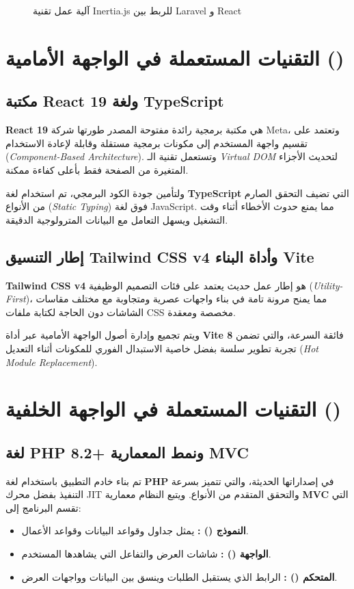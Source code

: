 \documentclass{bts-report-ar}
\begin{document}
\begin{figure}[H]
  \centering
  \begin{LTR}
  
  \end{LTR}
  \caption{آلية عمل تقنية Inertia.js للربط بين Laravel و React}
  \label{fig:inertia-bridge}
\end{figure}

\section{التقنيات المستعملة في الواجهة الأمامية ()}
\subsection{مكتبة React 19 ولغة TypeScript}
\textbf{React 19} هي مكتبة برمجية رائدة مفتوحة المصدر طورتها شركة Meta، وتعتمد على تقسيم واجهة المستخدم إلى مكونات برمجية مستقلة وقابلة لإعادة الاستخدام (\textit{Component-Based Architecture}). وتستعمل تقنية الـ \textit{Virtual DOM} لتحديث الأجزاء المتغيرة من الصفحة فقط بأعلى كفاءة ممكنة.

ولتأمين جودة الكود البرمجي، تم استخدام لغة \textbf{TypeScript} التي تضيف التحقق الصارم من الأنواع (\textit{Static Typing}) فوق لغة JavaScript. مما يمنع حدوث الأخطاء أثناء وقت التشغيل ويسهل التعامل مع البيانات المترولوجية الدقيقة.

\subsection{إطار التنسيق Tailwind CSS v4 وأداة البناء Vite}
\textbf{Tailwind CSS v4} هو إطار عمل حديث يعتمد على فئات التصميم الوظيفية (\textit{Utility-First})، مما يمنح مرونة تامة في بناء واجهات عصرية ومتجاوبة مع مختلف مقاسات الشاشات دون الحاجة لكتابة ملفات CSS مخصصة ومعقدة. 

ويتم تجميع وإدارة أصول الواجهة الأمامية عبر أداة \textbf{Vite 8} فائقة السرعة، والتي تضمن تجربة تطوير سلسة بفضل خاصية الاستبدال الفوري للمكونات أثناء التعديل (\textit{Hot Module Replacement}).

\section{التقنيات المستعملة في الواجهة الخلفية ()}
\subsection{لغة PHP 8.2+ ونمط المعمارية MVC}
تم بناء خادم التطبيق باستخدام لغة \textbf{PHP} في إصداراتها الحديثة، والتي تتميز بسرعة التنفيذ بفضل محرك JIT والتحقق المتقدم من الأنواع. ويتبع النظام معمارية \textbf{MVC} التي تقسم البرنامج إلى:
\begin{itemize}
  \item \textbf{النموذج () :} يمثل جداول وقواعد البيانات وقواعد الأعمال.
  \item \textbf{الواجهة () :} شاشات العرض والتفاعل التي يشاهدها المستخدم.
  \item \textbf{المتحكم () :} الرابط الذي يستقبل الطلبات وينسق بين البيانات وواجهات العرض.
\end{itemize}
\end{document}
